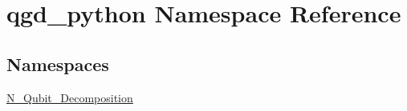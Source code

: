 \hypertarget{namespaceqgd__python}{}\section{qgd\+\_\+python Namespace Reference}
\label{namespaceqgd__python}
\subsection*{Namespaces}
\begin{DoxyCompactItemize}
\item 
 \hyperlink{namespaceqgd__python_1_1_n___qubit___decomposition}{N\+\_\+\+Qubit\+\_\+\+Decomposition}
\end{DoxyCompactItemize}
